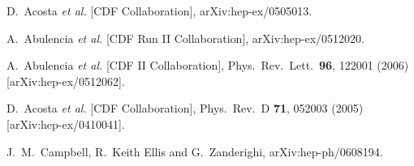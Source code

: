 \documentclass[12pt]{iopart}
\begin{document}
\begin{thebibliography}{99}

  D.~Acosta {\it et al.}  [CDF Collaboration],
  arXiv:hep-ex/0505013.


  A.~Abulencia {\it et al.}  [CDF Run II Collaboration],
  arXiv:hep-ex/0512020.

  A.~Abulencia {\it et al.}  [CDF II Collaboration],
  Phys.\ Rev.\ Lett.\  {\bf 96}, 122001 (2006)
  [arXiv:hep-ex/0512062].



  D.~Acosta {\it et al.}  [CDF Collaboration],
  Phys.\ Rev.\ D {\bf 71}, 052003 (2005)
  [arXiv:hep-ex/0410041].

  J.~M.~Campbell, R.~Keith Ellis and G.~Zanderighi,
  arXiv:hep-ph/0608194.


\end{thebibliography}
\end{document}
